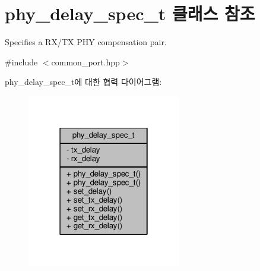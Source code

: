 \hypertarget{classphy__delay__spec__t}{}\section{phy\+\_\+delay\+\_\+spec\+\_\+t 클래스 참조}
\label{classphy__delay__spec__t}


Specifies a R\+X/\+TX P\+HY compensation pair.  




{\ttfamily \#include $<$common\+\_\+port.\+hpp$>$}



phy\+\_\+delay\+\_\+spec\+\_\+t에 대한 협력 다이어그램\+:
\nopagebreak
\begin{figure}[H]
\begin{center}
\leavevmode
\includegraphics[width=190pt]{classphy__delay__spec__t__coll__graph}
\end{center}
\end{figure}
